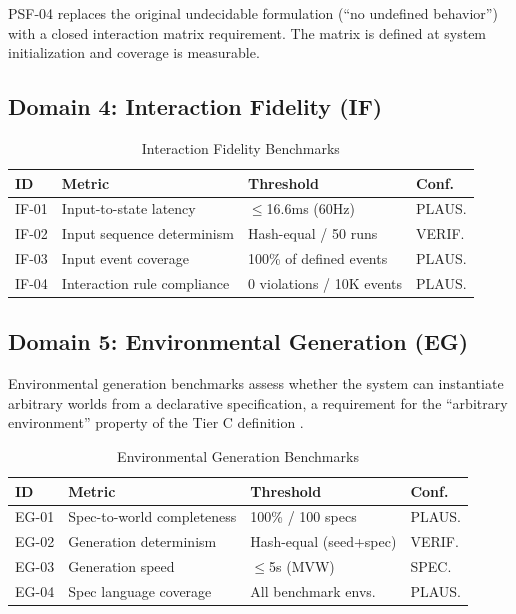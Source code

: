 \documentclass[conference]{IEEEtran}
\begin{document}
PSF-04 replaces the original undecidable formulation (``no undefined behavior'')
with a closed interaction matrix requirement. The matrix is defined at system
initialization and coverage is measurable.

\subsection{Domain 4: Interaction Fidelity (IF)}

\begin{table}[ht]
\caption{Interaction Fidelity Benchmarks}
\label{tab:if}
\centering
\small
\begin{tabular}{p{0.7cm}p{3.2cm}p{1.8cm}p{1.0cm}}
\toprule
\textbf{ID} & \textbf{Metric} & \textbf{Threshold} & \textbf{Conf.} \\
\midrule
IF-01 & Input-to-state latency & $\leq$16.6ms (60Hz) & PLAUS. \\
IF-02 & Input sequence determinism & Hash-equal / 50 runs & VERIF. \\
IF-03 & Input event coverage & 100\% of defined events & PLAUS. \\
IF-04 & Interaction rule compliance & 0 violations / 10K events & PLAUS. \\
\bottomrule
\end{tabular}
\end{table}

\subsection{Domain 5: Environmental Generation (EG)}

Environmental generation benchmarks assess whether the system can instantiate
arbitrary worlds from a declarative specification, a requirement for the
``arbitrary environment'' property of the Tier C definition \cite{resnick1997}.

\begin{table}[ht]
\caption{Environmental Generation Benchmarks}
\label{tab:eg}
\centering
\small
\begin{tabular}{p{0.7cm}p{3.2cm}p{1.8cm}p{1.0cm}}
\toprule
\textbf{ID} & \textbf{Metric} & \textbf{Threshold} & \textbf{Conf.} \\
\midrule
EG-01 & Spec-to-world completeness & 100\% / 100 specs & PLAUS. \\
EG-02 & Generation determinism & Hash-equal (seed+spec) & VERIF. \\
EG-03 & Generation speed & $\leq$5s (MVW) & SPEC. \\
EG-04 & Spec language coverage & All benchmark envs. & PLAUS. \\
\bottomrule
\end{tabular}
\end{table}
\end{document}
